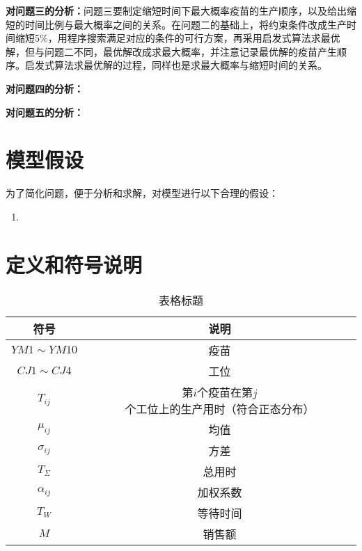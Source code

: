 \documentclass[UTF8]{ctexart}
\begin{document}
	\textbf{对问题三的分析：}问题三要制定缩短时间下最大概率疫苗的生产顺序，以及给出缩短的时间比例与最大概率之间的关系。在问题二的基础上，将约束条件改成生产时间缩短5\%，用程序搜索满足对应的条件的可行方案，再采用启发式算法求最优解，但与问题二不同，最优解改成求最大概率，并注意记录最优解的疫苗产生顺序。启发式算法求最优解的过程，同样也是求最大概率与缩短时间的关系。
	
	\textbf{对问题四的分析：}
	
	
	\textbf{对问题五的分析：}
	
	
	\section{模型假设}
	为了简化问题，便于分析和求解，对模型进行以下合理的假设：
	\begin{enumerate}
		\item
	\end{enumerate}
	
	\section{定义和符号说明}
	\begin{table}[htbp]
		\centering
		\begin{tabular}{ c c }
			\toprule[2pt]
			符号 & 说明   \\
			\hline
			$YM1\sim YM10$ & 疫苗  \\
			$CJ1\sim CJ4$ &  工位 \\
			$T_{ij}$&  第$i$个疫苗在第$j$个工位上的生产用时（符合正态分布）\\
			$\mu_{ij}$& 均值\\
			$\sigma_{ij}$ & 方差\\
			$T_{\Sigma}$ & 总用时 \\
			$\alpha_{ij}$ & 加权系数\\
			$T_{W}$ & 等待时间 \\
			$M$ & 销售额 \\
			  
			\bottomrule[2pt]
		\end{tabular}\caption{表格标题}\label{p1}
	\end{table}
	
\end{document}
